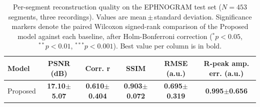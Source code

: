 \begin{table}[t]
\centering
\caption{Per-segment reconstruction quality on the EPHNOGRAM test set ($N=453$ segments, three recordings). Values are mean\,$\pm$\,standard deviation. Significance markers denote the paired Wilcoxon signed-rank comparison of the Proposed model against each baseline, after Holm-Bonferroni correction ($^{*}p<0.05$, $^{**}p<0.01$, $^{***}p<0.001$). Best value per column is in bold.}
\label{tab:persegment_stats}
\setlength{\tabcolsep}{4pt}
\begin{tabular}{lccccc}
\toprule
Model & PSNR (dB) & Corr. r & SSIM & RMSE (a.u.) & R-peak amp. err. (a.u.) \\
\midrule
Proposed & \textbf{17.10$\pm$5.07} & \textbf{0.610$\pm$0.404} & \textbf{0.903$\pm$0.072} & \textbf{0.695$\pm$0.319} & \textbf{0.995$\pm$0.656} \\
\bottomrule
\end{tabular}
\end{table}
